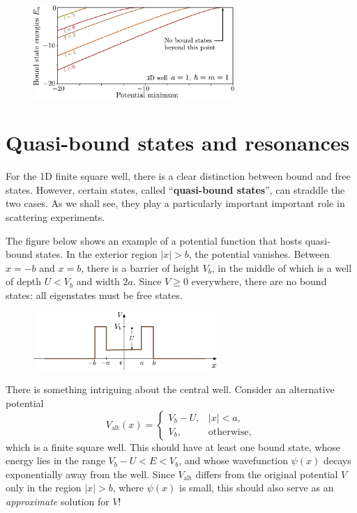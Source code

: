 \documentclass[pra,12pt]{revtex4-2}
\begin{document}
\vskip 0.15in
\begin{figure}[h]
  \centering\includegraphics[width=0.68\textwidth]{boundstate3d}
\end{figure}

\section{Quasi-bound states and resonances}
\label{sec:resonances}

For the 1D finite square well, there is a clear distinction between
bound and free states.  However, certain states, called
``\textbf{quasi-bound states}'', can straddle the two cases.  As we
shall see, they play a particularly important important role in
scattering experiments.

The figure below shows an example of a potential function that hosts
quasi-bound states.  In the exterior region $|x| > b$, the potential
vanishes.  Between $x = -b$ and $x = b$, there is a barrier of height
$V_b$, in the middle of which is a well of depth $U < V_b$ and width
$2a$.  Since $V \ge 0$ everywhere, there are no bound states: all
eigenstates must be free states.

\begin{figure}[h]
  \centering\includegraphics[width=0.62\textwidth]{resonancewell}
\end{figure}

There is something intriguing about the central well.  Consider an
alternative potential
\begin{equation}
  V_{\mathrm{alt}}(x) = \begin{cases}V_b - U, & |x| < a, \\ V_b, & \mathrm{otherwise},\end{cases}
\end{equation}
which is a finite square well.  This should have at least one bound
state, whose energy lies in the range $V_b-U < E < V_b$, and whose
wavefunction $\psi(x)$ decays exponentially away from the well.  Since
$V_{\mathrm{alt}}$ differs from the original potential $V$ only in the
region $|x| > b$, where $\psi(x)$ is small, this should also serve as
an \textit{approximate} solution for $V$!
\end{document}
